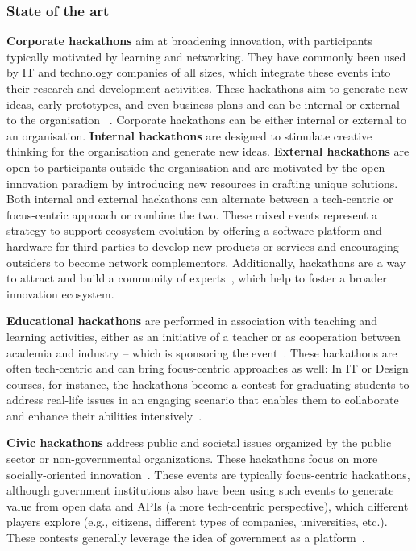 \documentclass{ieeeaccess}
\begin{document}
\subsubsection{State of the art}
\textbf{Corporate hackathons} aim at broadening innovation, with participants typically motivated by learning and networking. 
They have commonly been used by IT and technology companies of all sizes, which integrate these events into their research and development activities. 
These hackathons aim to generate new ideas, early prototypes, and even business plans and can be internal or external to the organisation ~\cite{pe2022corporate, flores2018can}. 
Corporate hackathons can be either internal or external to an organisation. 
\textbf{Internal hackathons} are designed to stimulate creative thinking for the organisation and generate new ideas. 
\textbf{External hackathons} are open to participants outside the organisation and are motivated by the open-innovation paradigm by introducing new resources in crafting unique solutions. 
Both internal and external hackathons can alternate between a tech-centric or focus-centric approach or combine the two.  
These mixed events represent a strategy to support ecosystem evolution by offering a software platform and hardware for third parties to develop new products or services and encouraging outsiders to become network complementors. 
Additionally, hackathons are a way to attract and build a community of experts~\cite{granados2019collaborative}, which help to foster a broader innovation ecosystem. 

\textbf{Educational hackathons} are performed in association with teaching and learning activities, either as an initiative of a teacher or as cooperation between academia and industry -- which is sponsoring the event~\cite{nandi2016, gama2018hackathons, porras2018hackathons}. 
These hackathons are often tech-centric and can bring focus-centric approaches as well:
In IT or Design courses, for instance, the hackathons become a contest for graduating students to address real-life issues in an engaging scenario that enables them to collaborate and enhance their abilities intensively~\cite{porras2018hackathons}.

\textbf{Civic hackathons} address public and societal issues organized by the public sector or non-governmental organizations. 
These hackathons focus on more socially-oriented innovation~\cite{briscoe2014digital,disalvo2014building}. 
These events are typically focus-centric hackathons, although government institutions also have been using such events to generate value from open data and APIs (a more tech-centric perspective), which different players explore (e.g., citizens, different types of companies, universities, etc.). 
These contests generally leverage the idea of government as a platform~\cite{safarov2017}.
\end{document}
